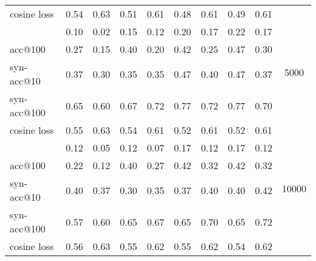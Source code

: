 \documentclass{article}
\begin{document}
\begin{table}[p]
{\begin{tabular}{l|c|c|c|c|c|c|c|c|c|}
			\\ \cline{1-9}
			\multicolumn{1}{|l|}{cosine loss}      & 0.54       & 0.63        & 0.51       & 0.61        & 0.48         & 0.61           & 0.49          & 0.61            &                   \\ \hlineB{4}
			\multicolumn{1}{|l|}{acc@10}           & 0.10       & 0.02        & 0.15       & 0.12        & 0.20         & 0.17           & 0.22          & 0.17            & \multirow{4}{*}{5000}            \\ \cline{1-9}
			\multicolumn{1}{|l|}{acc@100}          & 0.27       & 0.15        & 0.40       & 0.20        & 0.42         & 0.25           & 0.47          & 0.30            &                                  \\ \cline{1-9}
			\multicolumn{1}{|l|}{syn-acc@10}       & 0.37       & 0.30        & 0.35       & 0.35        & 0.47         & 0.40           & 0.47          & 0.37            &                                  \\ \cline{1-9}
			\multicolumn{1}{|l|}{syn-acc@100}      & 0.65       & 0.60        & 0.67       & 0.72        & 0.77         & 0.72           & 0.77          & 0.70            &    
			\\ \cline{1-9}
			\multicolumn{1}{|l|}{cosine loss}      & 0.55       & 0.63        & 0.54       & 0.61        & 0.52         & 0.61           & 0.52          & 0.61            &                   \\ \hlineB{4}
			\multicolumn{1}{|l|}{acc@10}           & 0.12       & 0.05        & 0.12       & 0.07        & 0.17         & 0.12           & 0.17          & 0.12            & \multirow{4}{*}{10000}           \\ \cline{1-9}
			\multicolumn{1}{|l|}{acc@100}          & 0.22       & 0.12        & 0.40       & 0.27        & 0.42         & 0.32           & 0.42          & 0.32            &                                  \\ \cline{1-9}
			\multicolumn{1}{|l|}{syn-acc@10}       & 0.40       & 0.37        & 0.30       & 0.35        & 0.37         & 0.40           & 0.40          & 0.42            &                                  \\ \cline{1-9}
			\multicolumn{1}{|l|}{syn-acc@100}      & 0.57       & 0.60        & 0.65       & 0.67        & 0.65         & 0.70           & 0.65          & 0.72            &                    
			\\ \cline{1-9}
			\multicolumn{1}{|l|}{cosine loss}      & 0.56       & 0.63        & 0.55       & 0.62        & 0.55         & 0.62           & 0.54          & 0.62            &                   \\

\end{tabular}}
\end{table}
\end{document}

